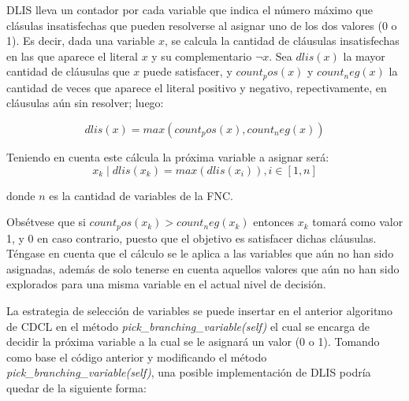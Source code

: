 DLIS lleva un contador por cada variable que indica el número máximo que clásulas insatisfechas que pueden resolverse al asignar uno de los dos valores (0 o 1). Es decir, dada una variable $x$, se calcula la cantidad de cláusulas insatisfechas en las que aparece el literal $x$ y su complementario $\neg x$. Sea $dlis(x)$ la mayor cantidad de cláusulas que $x$ puede satisfacer, y $count_pos(x)$ y $count_neg(x)$ la cantidad de veces que aparece el literal positivo y negativo, repectivamente, en cláusulas aún sin resolver; luego:

\begin{equation*}
dlis(x)=max(count_pos(x), count_neg(x))
\end{equation*}

Teniendo en cuenta este cálcula la próxima variable a asignar será:
\begin{equation*}
x_k \mid dlis(x_k)=max(dlis(x_i)), i \in [1,n]
\end{equation*}

donde $n$ es la cantidad de variables de la FNC.

Obsétvese que si $count_pos(x_k) > count_neg(x_k)$ entonces $x_k$ tomará como valor 1, y 0 en caso contrario, puesto que el objetivo es satisfacer dichas cláusulas. Téngase en cuenta que el cálculo se le aplica a las variables que aún no han sido asignadas, además de solo tenerse en cuenta aquellos valores que aún no han sido explorados para una misma variable en el actual nivel de decisión.

La estrategia de selección de variables se puede insertar en el anterior algoritmo de CDCL en el método \textit{pick\_branching\_variable(self)} el cual se encarga de decidir la próxima variable a la cual se le asignará un valor (0 o 1). Tomando como base el código anterior y modificando el método \textit{pick\_branching\_variable(self)}, una posible implementación de DLIS podría quedar de la siguiente forma:


